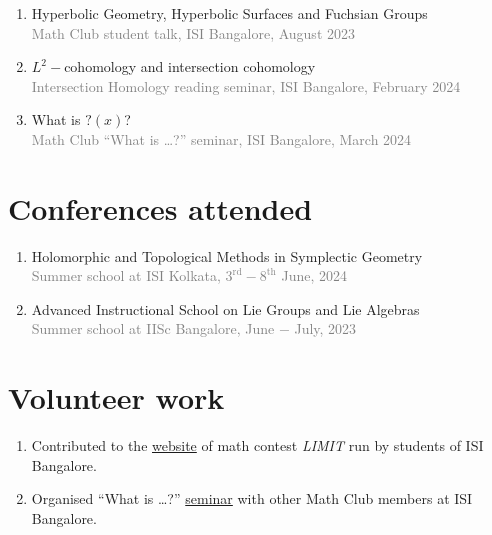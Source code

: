 \documentclass[a4paper, oneside, final]{scrartcl} %
\begin{document}
\begin{enumerate}[label = $\bullet$]
  \item Hyperbolic Geometry, Hyperbolic Surfaces and Fuchsian Groups \\
    \textcolor{grey}{Math Club student talk, ISI Bangalore, August 2023}
  \item \( L^2- \)cohomology and intersection cohomology \\
    \textcolor{grey}{Intersection Homology reading seminar, ISI Bangalore, February 2024}
  \item What is \( ?(x) \)? \\
    \textcolor{grey}{Math Club ``What is \dots ?'' seminar, ISI Bangalore, March 2024}
\end{enumerate}

\section{Conferences attended}

\begin{enumerate}[label = $\bullet$]
  \item Holomorphic and Topological Methods in Symplectic Geometry \\
    \textcolor{grey}{Summer school at ISI Kolkata, \( {3}^{\text{rd}} -  {8}^{\text{th}} \) June, 2024}
  \item Advanced Instructional School on Lie Groups and Lie Algebras \\
    \textcolor{grey}{Summer school at IISc Bangalore, June \( - \) July, 2023}
\end{enumerate}

\section{Volunteer work}

\begin{enumerate}[label = $\bullet$]
  \item Contributed to the \href{https://www.limitisi.in}{website} of math contest \textit{LIMIT} run by students of ISI Bangalore.
  \item Organised ``What is \dots ?'' \href{https://mathclubisib.github.io/seminars/what_is/}{seminar} with other Math Club members at ISI Bangalore.

\end{enumerate}

\end{document}
